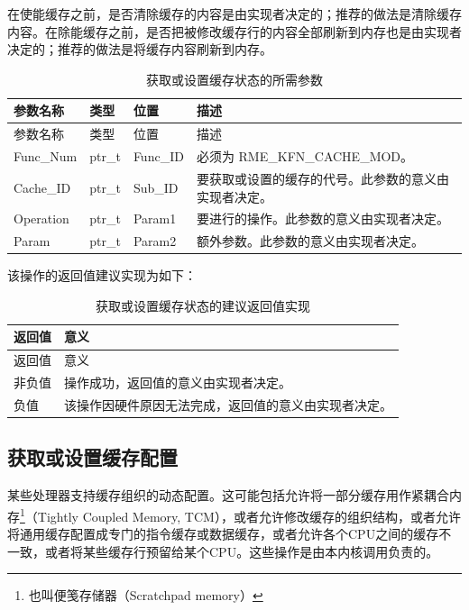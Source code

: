 在使能缓存之前，是否清除缓存的内容是由实现者决定的；推荐的做法是清除缓存内容。在除能缓存之前，是否把被修改缓存行的内容全部刷新到内存也是由实现者决定的；推荐的做法是将缓存内容刷新到内存。

\begin{xltabular}{\textwidth}{@{}>{\hsize\raggedright\arraybackslash}X>{\hsize\raggedright\arraybackslash}X>{\hsize\raggedright\arraybackslash}X>{\hsize\raggedright\arraybackslash}X@{}}
\caption{获取或设置缓存状态的所需参数}\label{tab:8-25-get-or-set-cache-state-parameters}\\
\toprule
参数名称 & 类型 & 位置 & 描述\tabularnewline
\endfirsthead
\toprule
参数名称 & 类型 & 位置 & 描述\tabularnewline
\midrule
\endhead
\bottomrule
\endlastfoot
Func\_Num & ptr\_t & Func\_ID & 必须为 RME\_KFN\_CACHE\_MOD。\tabularnewline
Cache\_ID & ptr\_t & Sub\_ID &
要获取或设置的缓存的代号。此参数的意义由实现者决定。\tabularnewline
Operation & ptr\_t & Param1 &
要进行的操作。此参数的意义由实现者决定。\tabularnewline
Param & ptr\_t & Param2 &
额外参数。此参数的意义由实现者决定。\tabularnewline
\end{xltabular}

该操作的返回值建议实现为如下：

\begin{xltabular}{\textwidth}{@{}>{\hsize\raggedright\arraybackslash}X>{\hsize\raggedright\arraybackslash}X@{}}
\caption{获取或设置缓存状态的建议返回值实现}\label{tab:8-26-get-or-set-cache-state-suggested-return-values}\\
\toprule
返回值 & 意义\tabularnewline
\endfirsthead
\toprule
返回值 & 意义\tabularnewline
\midrule
\endhead
\bottomrule
\endlastfoot
    非负值 & 操作成功，返回值的意义由实现者决定。\tabularnewline
    负值 & 该操作因硬件原因无法完成，返回值的意义由实现者决定。\tabularnewline
\end{xltabular}

\subsection{获取或设置缓存配置}\label{subsec:8-get-or-set-cache-configuration}

某些处理器支持缓存组织的动态配置。这可能包括允许将一部分缓存用作紧耦合内存\footnote{也叫便笺存储器（Scratchpad memory）}（Tightly
Coupled Memory,
TCM），或者允许修改缓存的组织结构，或者允许将通用缓存配置成专门的指令缓存或数据缓存，或者允许各个CPU之间的缓存不一致，或者将某些缓存行预留给某个CPU。这些操作是由本内核调用负责的。

